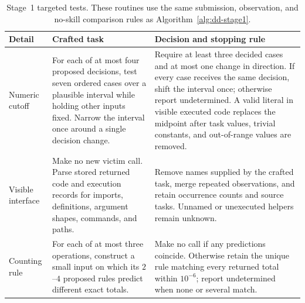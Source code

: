\begin{table}[t]
  \centering
  \caption{Stage~1 targeted tests.  These routines use the same submission,
  observation, and no-skill comparison rules as Algorithm~\ref{alg:dd-stage1}.}
  \label{tab:stage1-targeted}
  \scriptsize
  \renewcommand{\arraystretch}{1.08}
  \begin{tabularx}{\textwidth}{@{}p{}p{}X@{}}
    \toprule
    Detail & Crafted task & Decision and stopping rule \\
    \midrule
    Numeric cutoff &
      For each of at most four proposed decisions, test seven ordered cases over
      a plausible interval while holding other inputs fixed.  Narrow the interval
      once around a single decision change. &
      Require at least three decided cases and at most one change in direction.
      If every case receives the same decision, shift the interval once; otherwise
      report undetermined.  A valid literal in visible executed code replaces the
      midpoint after task values, trivial constants, and out-of-range values are
      removed. \\
    Visible interface &
      Make no new victim call.  Parse stored returned code and execution records
      for imports, definitions, argument shapes, commands, and paths. &
      Remove names supplied by the crafted task, merge repeated observations, and
      retain occurrence counts and source tasks.  Unnamed or unexecuted helpers
      remain unknown. \\
    Counting rule &
      For each of at most three operations, construct a small input on which its
      $2$--$4$ proposed rules predict different exact totals. &
      Make no call if any predictions coincide.  Otherwise retain the unique rule
      matching every returned total within $10^{-6}$; report undetermined when
      none or several match. \\
    \bottomrule
  \end{tabularx}
\end{table}

